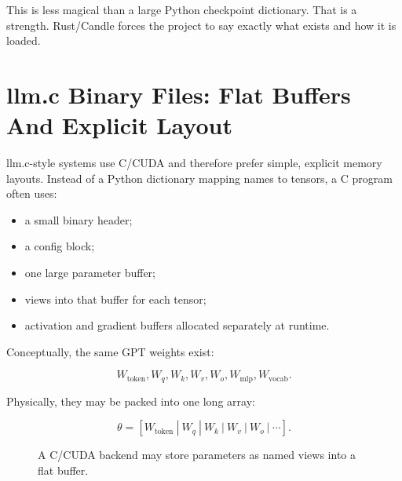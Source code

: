 This is less magical than a large Python checkpoint dictionary. That is a strength.
Rust/Candle forces the project to say exactly what exists and how it is loaded.

\section{llm.c Binary Files: Flat Buffers And Explicit Layout}

llm.c-style systems use C/CUDA and therefore prefer simple, explicit memory layouts.
Instead of a Python dictionary mapping names to tensors, a C program often uses:

\begin{itemize}
  \item a small binary header;
  \item a config block;
  \item one large parameter buffer;
  \item views into that buffer for each tensor;
  \item activation and gradient buffers allocated separately at runtime.
\end{itemize}

Conceptually, the same GPT weights exist:

\[
W_{\text{token}}, W_q, W_k, W_v, W_o, W_{\text{mlp}}, W_{\text{vocab}}.
\]

Physically, they may be packed into one long array:

\[
\theta =
[W_{\text{token}}\ |\ W_q\ |\ W_k\ |\ W_v\ |\ W_o\ |\ \cdots ].
\]

\begin{figure}[htbp]
\centering
{}
\caption{A C/CUDA backend may store parameters as named views into a flat buffer.}
\end{figure}

